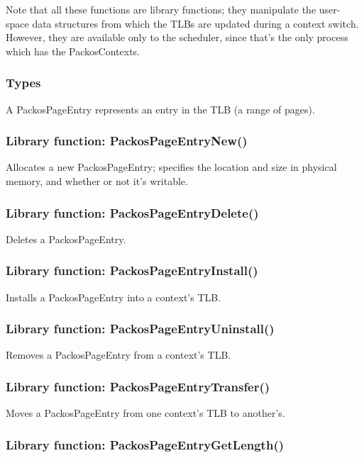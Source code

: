 \documentclass{article}
\begin{document}
Note that all these functions are library functions; they manipulate
the user-space data structures from which the TLBs are updated during
a context switch.  However, they are available only to the scheduler,
since that's the only process which has the PackosContexts.

\subsubsection{Types}

A PackosPageEntry represents an entry in the TLB (a range of pages).

\subsubsection{Library function: PackosPageEntryNew()}

Allocates a new PackosPageEntry; specifies the location and size in
physical memory, and whether or not it's writable.

\subsubsection{Library function: PackosPageEntryDelete()}

Deletes a PackosPageEntry.

\subsubsection{Library function: PackosPageEntryInstall()}

Installs a PackosPageEntry into a context's TLB.

\subsubsection{Library function: PackosPageEntryUninstall()}

Removes a PackosPageEntry from a context's TLB.

\subsubsection{Library function: PackosPageEntryTransfer()}

Moves a PackosPageEntry from one context's TLB to another's.

\subsubsection{Library function: PackosPageEntryGetLength()}
\end{document}
